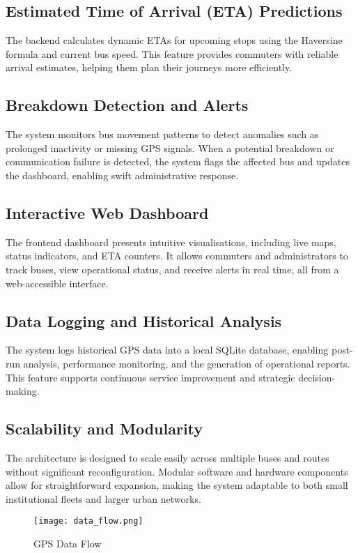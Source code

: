 \documentclass{article}
\begin{document}
\begin{multicols}{2}
\subsection{Estimated Time of Arrival (ETA) Predictions}
The backend calculates dynamic ETAs for upcoming stops using the Haversine formula and current bus speed. This feature provides commuters with reliable arrival estimates, helping them plan their journeys more efficiently.

\subsection{Breakdown Detection and Alerts}
The system monitors bus movement patterns to detect anomalies such as prolonged inactivity or missing GPS signals. When a potential breakdown or communication failure is detected, the system flags the affected bus and updates the dashboard, enabling swift administrative response.

\subsection{Interactive Web Dashboard}
The frontend dashboard presents intuitive visualisations, including live maps, status indicators, and ETA counters. It allows commuters and administrators to track buses, view operational status, and receive alerts in real time, all from a web-accessible interface.

\subsection{Data Logging and Historical Analysis}
The system logs historical GPS data into a local SQLite database, enabling post-run analysis, performance monitoring, and the generation of operational reports. This feature supports continuous service improvement and strategic decision-making.

\subsection{Scalability and Modularity}
The architecture is designed to scale easily across multiple buses and routes without significant reconfiguration. Modular software and hardware components allow for straightforward expansion, making the system adaptable to both small institutional fleets and larger urban networks.


\begin{figure}[H]
\centering
\texttt{[image: data\_flow.png]} %
\caption{GPS Data Flow}
\label{fig:gps}
\end{figure}



\end{multicols}
\end{document}
